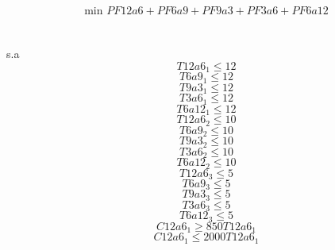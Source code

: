 \\
\\
$$ \mbox{min } PF12a6 + PF6a9 + PF9a3 + PF3a6 + PF6a12 $$
\\ 
\\  
s.a\\
\begin{equation}
T12a6_{1} \leq 12
\end{equation}
\begin{equation}
T6a9_{1} \leq 12
\end{equation}
\begin{equation}
T9a3_{1} \leq 12
\end{equation}
\begin{equation}
T3a6_{1} \leq 12
\end{equation}
\begin{equation}
T6a12_{1} \leq 12 
\end{equation}
\begin{equation}
T12a6_{2} \leq 10
\end{equation}
\begin{equation}
T6a9_{2} \leq 10
\end{equation}
\begin{equation}
T9a3_{2} \leq 10
\end{equation}
\begin{equation}
T3a6_{2} \leq 10
\end{equation}
\begin{equation}
T6a12_{2} \leq 10 
\end{equation}
\begin{equation}
T12a6_{3} \leq 5
\end{equation}
\begin{equation}
T6a9_{3} \leq 5
\end{equation}
\begin{equation}
T9a3_{3} \leq 5
\end{equation}
\begin{equation}
T3a6_{3} \leq 5
\end{equation}
\begin{equation}
T6a12_{3} \leq 5 
\end{equation}
\begin{equation}
C12a6_{1} \geq 850 T12a6_{1}
\end{equation}
\begin{equation}
C12a6_{1} \leq 2000 T12a6_{1}
\end{equation}
